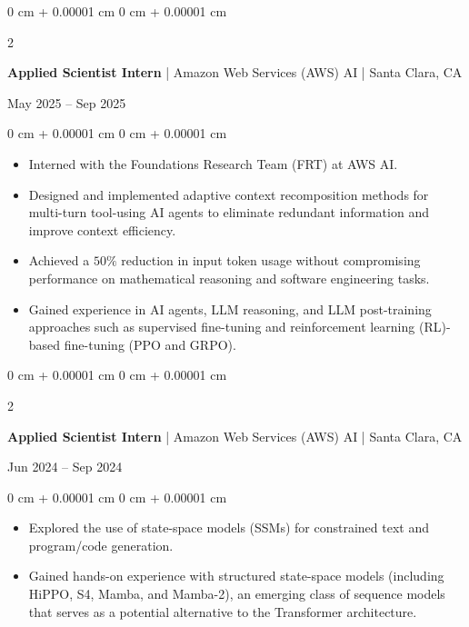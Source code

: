 \documentclass[10pt, letterpaper]{article}
\newenvironment{highlights}{
    \begin{itemize}[
        topsep=0.10 cm,
        parsep=0.10 cm,
        partopsep=0pt,
        itemsep=0pt,
        leftmargin=0 cm + 10pt
    ]
}{
    \end{itemize}
} %
\newenvironment{onecolentry}{
    \begin{adjustwidth}{
        0 cm + 0.00001 cm
    }{
        0 cm + 0.00001 cm
    }
}{
    \end{adjustwidth}
} %
\newenvironment{twocolentry}[2][]{
    \onecolentry
    \def\secondColumn{#2}
    \setcolumnwidth{\fill, 4.5 cm}
    \begin{paracol}{2}
}{
    \switchcolumn \raggedleft \secondColumn
    \end{paracol}
    \endonecolentry
} %
\begin{document}
        \begin{twocolentry}{May 2025 – Sep 2025}
        \textbf{Applied Scientist Intern} | Amazon Web Services (AWS) AI | Santa Clara, CA
        \end{twocolentry}
        \vspace{0.10 cm}
        \begin{onecolentry}
            \begin{highlights}
                \item Interned with the Foundations Research Team (FRT) at AWS AI.
                \item Designed and implemented adaptive context recomposition methods for multi-turn tool-using AI agents to eliminate redundant information and improve context efficiency. 
                \item Achieved a $50 \%$ reduction in input token usage without compromising performance on mathematical reasoning and software engineering tasks.
                \item Gained experience in AI agents, LLM reasoning, and LLM post-training approaches such as supervised fine-tuning and reinforcement learning (RL)-based fine-tuning (PPO and GRPO).
            \end{highlights}
        \end{onecolentry}

        \vspace{0.2 cm}

        \begin{twocolentry}{Jun 2024 – Sep 2024}
        \textbf{Applied Scientist Intern} | Amazon Web Services (AWS) AI | Santa Clara, CA
        \end{twocolentry}
        \vspace{0.10 cm}
        \begin{onecolentry}
            \begin{highlights}
                \item Explored the use of state-space models (SSMs) for constrained text and program/code generation.
                \item Gained hands-on experience with structured state-space models (including HiPPO, S4, Mamba, and Mamba-2), an emerging class of sequence models that serves as a potential alternative to the Transformer architecture.
            \end{highlights}
        \end{onecolentry}

        \vspace{0.2 cm}
\end{document}
